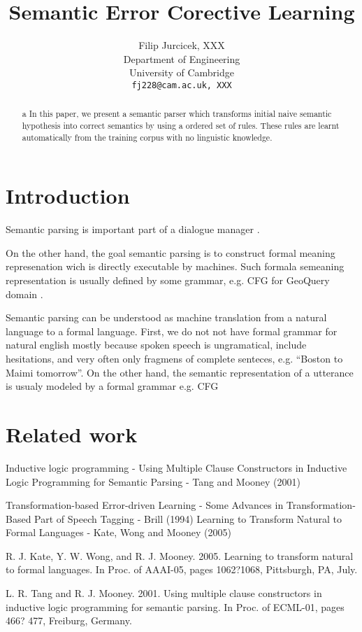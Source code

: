 \documentclass[11pt]{article}
\title{Semantic Error Corective Learning}
\author{Filip Jurcicek, XXX \\
  Department of Engineering \\
  University of Cambridge \\
  {\tt fj228@cam.ac.uk, XXX}}
\date{}
\begin{document}
\maketitle
\begin{abstract}a
  In this paper, we present a semantic parser which transforms initial naive semantic hypothesis into correct semantics by using a ordered set of rules. These rules are learnt automatically from the training corpus with no linguistic knowledge.
\end{abstract}

\section{Introduction}

Semantic parsing is important part of a dialogue manager \cite{williams07,thomson08}. 

On the other hand, the goal semantic parsing is to construct formal meaning represenation wich is directly executable by machines. Such formala semeaning representation is usually defined by some grammar, e.g. CFG for GeoQuery domain \cite{wong06}.

Semantic parsing can be understood as machine translation from a natural language to a formal language. First, we do not not have formal grammar for natural english mostly because spoken speech is ungramatical, include hesitations, and very often only fragmens of complete senteces, e.g. ``Boston to Maimi tomorrow''. On the other hand, the semantic representation of a utterance is usualy modeled by a formal grammar e.g. CFG

\section{Related work}

Inductive logic programming - Using Multiple Clause Constructors in Inductive Logic Programming for Semantic Parsing - Tang and Mooney (2001)

Transformation-based Error-driven Learning - Some Advances in Transformation-Based Part of Speech Tagging - Brill (1994)
Learning to Transform Natural to Formal Languages - Kate, Wong and Mooney (2005)

R. J. Kate, Y. W. Wong, and R. J. Mooney. 2005. Learning
to transform natural to formal languages. In Proc.
of AAAI-05, pages 1062?1068, Pittsburgh, PA, July.

L. R. Tang and R. J. Mooney. 2001. Using multiple
clause constructors in inductive logic programming for
semantic parsing. In Proc. of ECML-01, pages 466?
477, Freiburg, Germany.
\end{document}
